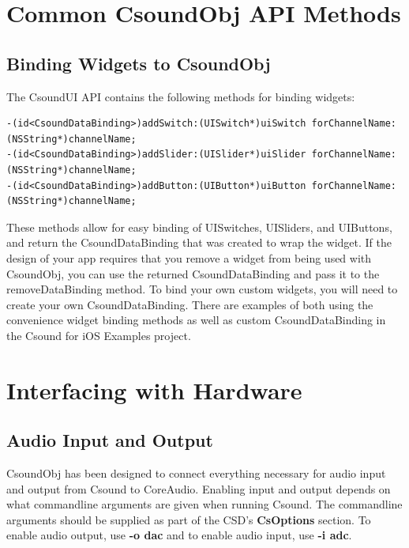 \documentclass[11pt]{article}
\begin{document}

\section{Common CsoundObj API Methods}

\subsection{Binding Widgets to CsoundObj}

The CsoundUI API contains the following methods for binding widgets:

\begin{lstlisting}[caption=Methods for Widget Binding]
-(id<CsoundDataBinding>)addSwitch:(UISwitch*)uiSwitch forChannelName:(NSString*)channelName;
-(id<CsoundDataBinding>)addSlider:(UISlider*)uiSlider forChannelName:(NSString*)channelName;
-(id<CsoundDataBinding>)addButton:(UIButton*)uiButton forChannelName:(NSString*)channelName;
\end{lstlisting}

These methods allow for easy binding of UISwitches, UISliders, and UIButtons, and return the CsoundDataBinding that was created to wrap the widget. If the design of your app requires that you remove a widget from being used with CsoundObj, you can use the returned CsoundDataBinding and pass it to the removeDataBinding method. To bind your own custom widgets, you will need to create your own CsoundDataBinding.  There are examples of both using the convenience widget binding methods as well as custom CsoundDataBinding in the Csound for iOS Examples project.


\section{Interfacing with Hardware}
\subsection{Audio Input and Output}

CsoundObj has been designed to connect everything necessary for audio input and output from Csound to CoreAudio.  Enabling input and output depends on what commandline arguments are given when running Csound.  The commandline arguments should be supplied as part of the CSD's \textbf{CsOptions} section.  To enable audio output, use \textbf{-o dac} and to enable audio input, use \textbf{-i adc}.
\end{document}
